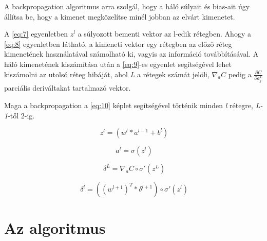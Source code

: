 A backpropagation algoritmus arra szolgál, hogy a háló súlyait és bias-ait úgy állítsa be, hogy a kimenet megközelítse minél jobban az elvárt kimenetet.

A \ref{eq:7} egyenletben $z^l$ a súlyozott bementi vektor az l-edik rétegben. Ahogy a \ref{eq:8} egyenletben látható, a kimeneti vektor egy rétegben az előző réteg kimenetének használatával számolható ki, vagyis az információ továbbításával. A háló kimenetének kiszámítása után a \ref{eq:9}-es egyenlet segítségével lehet kiszámolni az utolsó réteg hibáját, ahol \textit{L} a rétegek számát jelöli, \textit{$\nabla_aC$} pedig a $\frac{\partial C}{\partial a_j^L}$ parciális deriváltakat tartalmazó vektor.


Maga a backpropagation a \ref{eq:10} képlet segítségével történik minden \textit{l} rétegre, \textit{L-1}-től 2-ig.

\begin{equation} \label{eq:7}
\ z^l = (w^l*a^{l-1} + b^l) 
\end{equation}

\begin{equation} \label{eq:8}
\ a^l = \sigma(z^l) 
\end{equation}

\begin{equation} \label{eq:9}
\ \delta^L = \nabla_aC \circ \sigma'(z^L)
\end{equation}

\begin{equation} \label{eq:10}
\ \delta^l = ((w^{l+1})^T* \delta^{l+1}) \circ \sigma'(z^l)
\end{equation}

\chapter{Az algoritmus} \label{algorihm}

